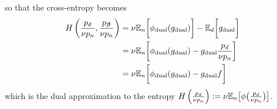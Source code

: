 %
so that the cross-entropy becomes
%
\begin{align*}
    H \left( 
    \frac{{\color{black} p_d}}{\nu {\color{black} p_n}}
    ,
    \frac{p_{{\bm{\beta}}}}{\nu {\color{black} p_n}}
    \right) 
    & =
    \nu \mathbb{E}_n
    \bigg[
    \phi_{\mathrm{dual}}(g_{\mathrm{dual}})
    \bigg]
    -
    \mathbb{E}_d
    \bigg[
    g_{\mathrm{dual}} 
    \bigg]
    \\
    & =
    \nu \mathbb{E}_n
    \bigg[
    \phi_{\mathrm{dual}}(g_{\mathrm{dual}})
    -
    g_{\mathrm{dual}} 
    \frac{{\color{black} p_d}}{\nu {\color{black} p_n}}
    \bigg]
    \\
    & =
    \nu \mathbb{E}_n
    \bigg[
    \phi_{\mathrm{dual}}(g_{\mathrm{dual}})
    -
    g_{\mathrm{dual}} 
    f
    \bigg]
\end{align*}
%
which is the dual approximation to the entropy $H \left( 
\frac{{\color{black} p_d}}{\nu {\color{black} p_n}} 
\right) 
:=
\nu \mathbb{E}_n
\big[
\phi
\big(
\frac{{\color{black} p_d}}{\nu {\color{black} p_n}}
\big)
\big]$.
